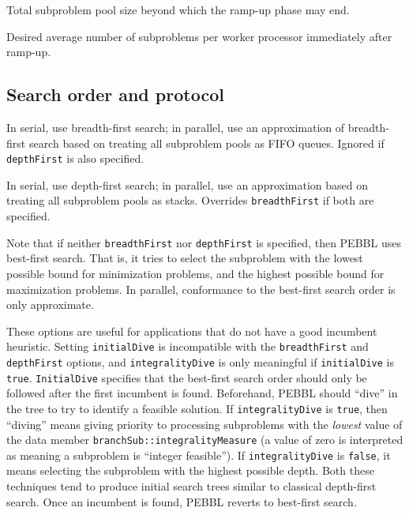 Total subproblem pool size beyond which the ramp-up phase may end.

Desired average number of subproblems per worker processor
immediately after ramp-up.


\subsection{Search order and protocol}
\label{sec:searchparams}
\vspace{-3ex}
In serial, use breadth-first search; in parallel, use an approximation
of breadth-first search based on treating all subproblem pools as FIFO
queues.  Ignored if \texttt{depthFirst} is also specified.

In serial, use depth-first search; in
parallel, use an approximation based on treating all
subproblem pools as stacks.  Overrides \texttt{breadthFirst} if both
are specified.

\vspace{2ex}

Note that if neither \texttt{breadthFirst} nor \texttt{depthFirst} is
specified, then PEBBL uses best-first search.  That is, it tries to
select the subproblem with the lowest possible bound for minimization
problems, and the highest possible bound for maximization problems.
In parallel, conformance to the best-first search order is only approximate.

\groupparams
{} 
These options are useful for
applications that do not have a good incumbent heuristic.  Setting
\texttt{initialDive} is incompatible with the \texttt{breadthFirst}
and \texttt{depthFirst} options, and \texttt{integralityDive} is only
meaningful if \texttt{initialDive} is \texttt{true}.
\texttt{InitialDive} specifies that the best-first search order should
only be followed after the first incumbent is found.  Beforehand,
PEBBL should ``dive'' in the tree to try to identify a feasible
solution.  If \texttt{integralityDive} is \texttt{true}, then
``diving'' means giving priority to processing subproblems with the
\emph{lowest} value of the data member
\texttt{branchSub::integralityMeasure} (a value of zero 
is interpreted as meaning a subproblem is
``integer feasible'').  If \texttt{integralityDive} is \texttt{false},
it means selecting the subproblem with the highest possible depth.
Both these techniques tend to produce initial search trees similar to
classical depth-first search.  Once an incumbent is found, PEBBL
reverts to best-first search.

